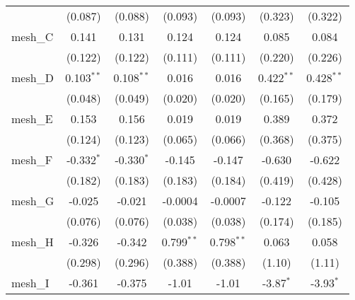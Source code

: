 \begin{tabular}{lcccccc}
                                                               & (0.087)       & (0.088)        & (0.093)       & (0.093)        & (0.323)       & (0.322)\\   
   mesh\_C                                                     & 0.141         & 0.131          & 0.124         & 0.124          & 0.085         & 0.084\\   
                                                               & (0.122)       & (0.122)        & (0.111)       & (0.111)        & (0.220)       & (0.226)\\   
   mesh\_D                                                     & 0.103$^{**}$  & 0.108$^{**}$   & 0.016         & 0.016          & 0.422$^{**}$  & 0.428$^{**}$\\   
                                                               & (0.048)       & (0.049)        & (0.020)       & (0.020)        & (0.165)       & (0.179)\\   
   mesh\_E                                                     & 0.153         & 0.156          & 0.019         & 0.019          & 0.389         & 0.372\\   
                                                               & (0.124)       & (0.123)        & (0.065)       & (0.066)        & (0.368)       & (0.375)\\   
   mesh\_F                                                     & -0.332$^{*}$  & -0.330$^{*}$   & -0.145        & -0.147         & -0.630        & -0.622\\   
                                                               & (0.182)       & (0.183)        & (0.183)       & (0.184)        & (0.419)       & (0.428)\\   
   mesh\_G                                                     & -0.025        & -0.021         & -0.0004       & -0.0007        & -0.122        & -0.105\\   
                                                               & (0.076)       & (0.076)        & (0.038)       & (0.038)        & (0.174)       & (0.185)\\   
   mesh\_H                                                     & -0.326        & -0.342         & 0.799$^{**}$  & 0.798$^{**}$   & 0.063         & 0.058\\   
                                                               & (0.298)       & (0.296)        & (0.388)       & (0.388)        & (1.10)        & (1.11)\\   
   mesh\_I                                                     & -0.361        & -0.375         & -1.01         & -1.01          & -3.87$^{*}$   & -3.93$^{*}$\\   

\end{tabular}
